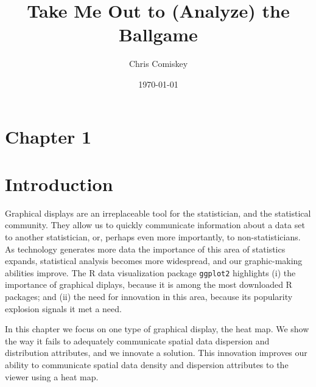 \documentclass{article}
\title{Take Me Out to (Analyze) the Ballgame}
\author{Chris Comiskey}
\date{\today}
\begin{document}
\maketitle{}


\section*{Chapter 1} %


\section{Introduction}
Graphical displays are an irreplaceable tool for the statistician, and the statistical community. They allow us to quickly communicate information about a data set to another statistician, or, perhaps even more importantly, to non-statisticians. As technology generates more data the importance of this area of statistics expands, statistical analysis becomes more widespread, and our graphic-making abilities improve. The R data visualization package \verb|ggplot2| highlights (i) the importance of graphical diplays, because it is among the most downloaded R packages; and (ii) the need for innovation in this area, because its popularity explosion signals it met a need.

In this chapter we focus on one type of graphical display, the heat map. We show the way it fails to adequately communicate spatial data dispersion and distribution attributes, and we innovate a solution. This innovation improves our ability to communicate spatial data density and dispersion attributes to the viewer using a heat map.
\end{document}
